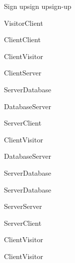 \begin{sdfig}{Sign up}{sign up}{sign-up}

  \begin{umlcall}[op={Sign up}]{Visitor}{Client}
    \begin{umlcall}[op={Validate}]{Client}{Client}
      \begin{umlfragment}[type=alt, label=valid]
        \begin{umlcall}[type=return,op={Loading}]{Client}{Visitor}
          \begin{umlcall}[op={Sign up}]{Client}{Server}
            \begin{umlcall}[op={Has user}]{Server}{Database}
              \begin{umlfragment}[type=alt, label=true]
                \begin{umlcall}[type=return,op={Yes}]{Database}{Server}
                  \begin{umlcall}[type=return,op={Error}]{Server}{Client}
                    \begin{umlcall}[type=return,op={Error}]{Client}{Visitor}
                    \end{umlcall}
                  \end{umlcall}
                \end{umlcall}
                \umlfpart[else]
                \begin{umlcall}[type=return,op={No}]{Database}{Server}
                  \begin{umlcall}[op={Create user}]{Server}{Database}
                  \end{umlcall}
                  \begin{umlcall}[op={Create OTP}]{Server}{Database}
                    \begin{umlcall}[op={Send email}]{Server}{Server}
                      \begin{umlcall}[type=return,op={Ok}]{Server}{Client}
                        \begin{umlcall}[type=return,op={Ok}]{Client}{Visitor}
                        \end{umlcall}
                      \end{umlcall}
                    \end{umlcall}
                  \end{umlcall}
                \end{umlcall}
              \end{umlfragment}
            \end{umlcall}
          \end{umlcall}
        \end{umlcall}
        \umlfpart[else]
        \begin{umlcall}[type=return,op={Error}]{Client}{Visitor}
        \end{umlcall}
      \end{umlfragment}
    \end{umlcall}
  \end{umlcall}
\end{sdfig}
